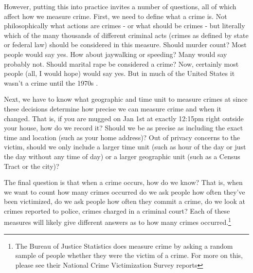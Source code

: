 \documentclass[
  12pt,
  openany]{book}
\begin{document}
However, putting this into practice invites a number of questions, all of which affect how we measure crime. First, we need to define what a crime is. Not philosophically what actions are crimes - or what should be crimes - but literally which of the many thousands of different criminal acts (crimes as defined by state or federal law) should be considered in this measure. Should murder count? Most people would say yes. How about jaywalking or speeding? Many would say probably not. Should marital rape be considered a crime? Now, certainly most people (all, I would hope) would say yes. But in much of the United States it wasn't a crime until the 1970s \citep{bennice2003marital, mcmahon2009criminalizing}.

Next, we have to know what geographic and time unit to measure crimes at since these decisions determine how precise we can measure crime and when it changed. That is, if you are mugged on Jan 1st at exactly 12:15pm right outside your house, how do we record it? Should we be as precise as including the exact time and location (such as your home address)? Out of privacy concerns to the victim, should we only include a larger time unit (such as hour of the day or just the day without any time of day) or a larger geographic unit (such as a Census Tract or the city)?

The final question is that when a crime occurs, how do we know? That is, when we want to count how many crimes occurred do we ask people how often they've been victimized, do we ask people how often they commit a crime, do we look at crimes reported to police, crimes charged in a criminal court? Each of these measures will likely give different answers as to how many crimes occurred.\footnote{The Bureau of Justice Statistics does measure crime by asking a random sample of people whether they were the victim of a crime. For more on this, please see their National Crime Victimization Survey reports}
\end{document}
